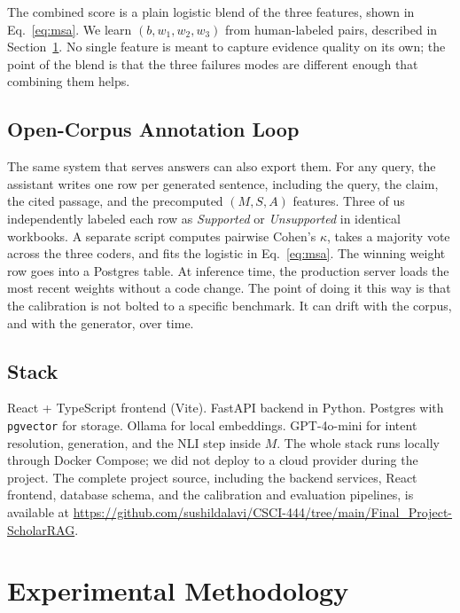 \documentclass[10pt]{article}
\begin{document}
The combined score is a plain logistic blend of the three features,
shown in Eq.~\ref{eq:msa}. We learn $(b, w_1, w_2, w_3)$ from
human-labeled pairs, described in Section~\ref{sec:methodology}. No
single feature is meant to capture evidence quality on its own; the
point of the blend is that the three failures modes are different
enough that combining them helps.

\subsection{Open-Corpus Annotation Loop}
The same system that serves answers can also export them. For any
query, the assistant writes one row per generated sentence, including
the query, the claim, the cited passage, and the precomputed $(M, S,
A)$ features. Three of us independently labeled each row as
\emph{Supported} or \emph{Unsupported} in identical workbooks. A
separate script computes pairwise Cohen's $\kappa$, takes a
majority vote across the three coders, and fits the logistic in
Eq.~\ref{eq:msa}. The winning weight row goes into a Postgres table.
At inference time, the production server loads the most recent
weights without a code change. The point of doing it this way is
that the calibration is not bolted to a specific benchmark. It can
drift with the corpus, and with the generator, over time.

\subsection{Stack}
React + TypeScript frontend (Vite). FastAPI backend in Python.
Postgres with \texttt{pgvector} for storage. Ollama for local
embeddings. GPT-4o-mini for intent resolution, generation, and the
NLI step inside $M$. The whole stack runs locally through Docker
Compose; we did not deploy to a cloud provider during the project.
The complete project source, including the backend services, React
frontend, database schema, and the calibration and evaluation
pipelines, is available at
\url{https://github.com/sushildalavi/CSCI-444/tree/main/Final_Project-ScholarRAG}.

\section{Experimental Methodology}
\label{sec:methodology}
\end{document}
